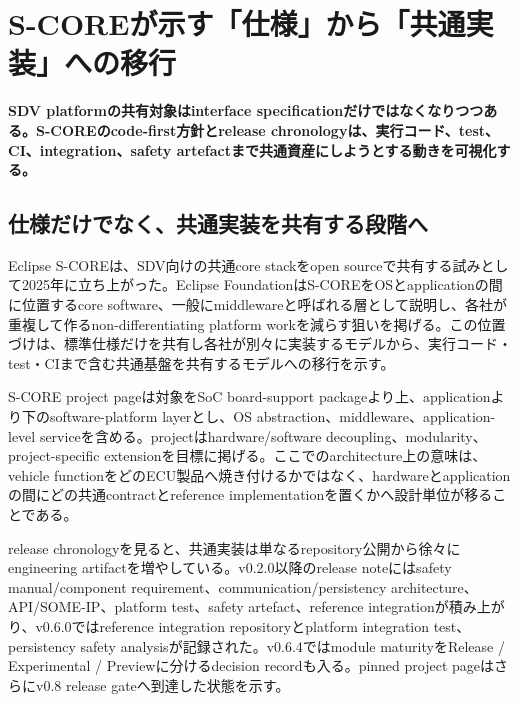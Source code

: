 \section{S-COREが示す「仕様」から「共通実装」への移行}
\noindent\textbf{SDV platformの共有対象はinterface specificationだけではなくなりつつある。S-COREのcode-first方針とrelease chronologyは、実行コード、test、CI、integration、safety artefactまで共通資産にしようとする動きを可視化する。}\autocite{src-315ed9fdbb11,src-5ae1a99f6a86,src-7aa0d4da204c,src-b89108e03021,src-d63061aaba8e,src-df5a66eed297,src-fa6bfa6f142c}

\begin{surveyarticlebody}
\subsection{仕様だけでなく、共通実装を共有する段階へ}

Eclipse S-COREは、SDV向けの共通core stackをopen sourceで共有する試みとして2025年に立ち上がった。Eclipse FoundationはS-COREをOSとapplicationの間に位置するcore software、一般にmiddlewareと呼ばれる層として説明し、各社が重複して作るnon-differentiating platform workを減らす狙いを掲げる。この位置づけは、標準仕様だけを共有し各社が別々に実装するモデルから、実行コード・test・CIまで含む共通基盤を共有するモデルへの移行を示す。\autocite{src-2f548bd2c797,src-d63061aaba8e}

S-CORE project pageは対象をSoC board-support packageより上、applicationより下のsoftware-platform layerとし、OS abstraction、middleware、application-level serviceを含める。projectはhardware/software decoupling、modularity、project-specific extensionを目標に掲げる。ここでのarchitecture上の意味は、vehicle functionをどのECU製品へ焼き付けるかではなく、hardwareとapplicationの間にどの共通contractとreference implementationを置くかへ設計単位が移ることである。\autocite{src-d63061aaba8e}

release chronologyを見ると、共通実装は単なるrepository公開から徐々にengineering artifactを増やしている。v0.2.0以降のrelease noteにはsafety manual/component requirement、communication/persistency architecture、API/SOME-IP、platform test、safety artefact、reference integrationが積み上がり、v0.6.0ではreference integration repositoryとplatform integration test、persistency safety analysisが記録された。v0.6.4ではmodule maturityをRelease / Experimental / Previewに分けるdecision recordも入る。pinned project pageはさらにv0.8 release gateへ到達した状態を示す。\autocite{src-315ed9fdbb11,src-5ae1a99f6a86,src-7aa0d4da204c,src-b89108e03021,src-d63061aaba8e,src-df5a66eed297,src-fa6bfa6f142c}


\end{surveyarticlebody}
